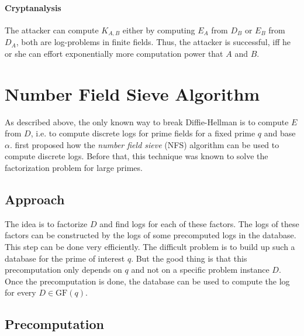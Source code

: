 \documentclass[paper=a4, fontsize=11pt]{scrartcl} %
\numberwithin{equation}{section} %
\numberwithin{figure}{section} %
\numberwithin{table}{section} %
\begin{document}
\paragraph{Cryptanalysis}
The attacker can compute $K_{A,B}$ either by computing $E_A$ from $D_B$ or $E_B$ from $D_A$, both are log-problems in finite fields. Thus, the attacker is successful, iff he or she can effort exponentially more computation power that $A$ and $B$.

\section{Number Field Sieve Algorithm}
As described above, the only known way to break Diffie-Hellman is to compute $E$ from $D$, i.e. to compute discrete logs for prime fields for a fixed prime $q$ and base $\alpha$. \citep{gordon1993discrete} first proposed how the \textit{number field sieve} (NFS) algorithm can be used to compute discrete logs. Before that, this technique was known to solve the factorization problem for large primes.

\subsection{Approach}
The idea is to factorize $D$ and find logs for each of these factors. The logs of these factors can be constructed by the logs of some precomputed logs in the database. This step can be done very efficiently. The difficult problem is to build up such a database for the prime of interest $q$. But the good thing is that this precomputation only depends on $q$ and not on a specific problem instance $D$. Once the precomputation is done, the database can be used to compute the log for every $D\in \mathrm{GF}(q)$.

\subsection{Precomputation}
\end{document}
